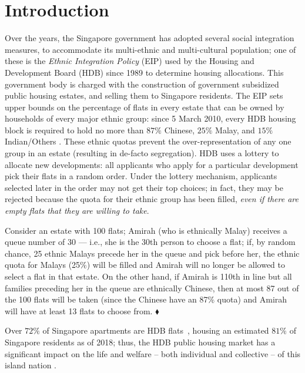 \documentclass[11pt,dvipdfmx]{article}
\begin{document}
\section{Introduction}\label{sec:intro}
Over the years, the Singapore government has adopted several social integration measures, to accommodate its multi-ethnic and multi-cultural population; one of these is the {\em Ethnic Integration Policy} (EIP) used by the Housing and Development Board (HDB) since 1989 \cite{Parl1989} to determine housing allocations. This government body is charged with the construction of government subsidized public housing estates, and selling them to Singapore residents. 
The EIP sets upper bounds on the percentage of flats in every estate that can be owned by households of every major ethnic group: since 5 March 2010, every HDB housing block is required to hold no more than $87\%$ Chinese, $25\%$ Malay, and $15\%$ Indian/Others \cite{HDB10PR,deng2013publichousing}. 
These ethnic quotas prevent the over-representation of any one group in an estate (resulting in de-facto segregation). 
HDB uses a lottery to allocate new developments: all applicants who apply for a particular development pick their flats in a random order. 
Under the lottery mechanism, applicants selected later in the order may not get their top choices; in fact, they may be rejected because the quota for their ethnic group has been filled, {\em even if there are empty flats that they are willing to take}.
\begin{example}
	Consider an estate with 100 flats; Amirah (who is ethnically Malay) receives a queue number of 30 --- i.e., she is the 30th person to choose a flat; if, by random chance, 25 ethnic Malays precede her in the queue and pick before her, the ethnic quota for Malays (25\%) will be filled and Amirah will no longer be allowed to select a flat in that estate. On the other hand, if Amirah is 110th in line but all families preceding her in the queue are ethnically Chinese, then at most 87 out of the 100 flats will be taken (since the Chinese have an 87\% quota) and Amirah will have at least 13 flats to choose from. \hfill $\blacklozenge$
\end{example}
Over $72\%$ of Singapore apartments are HDB flats~\cite{Sing2018}, housing an estimated $81\%$ of Singapore residents \cite{HDB18keystats} as of 2018; thus, the HDB public housing market has a significant impact on the life and welfare -- both individual and collective -- of this island nation \cite{chua1991race,deng2013publichousing,kim2013singapore,sim2003public,wong2014estimating}. 
\end{document}
